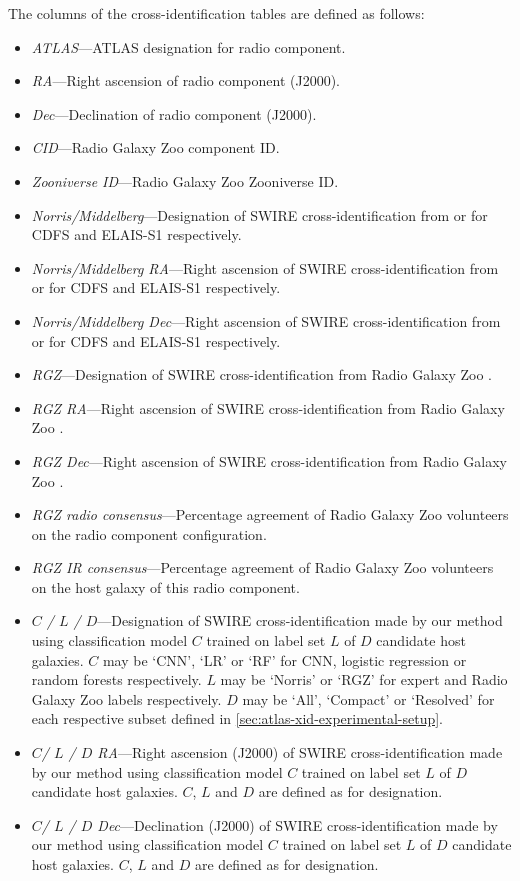   The columns of the cross-identification tables are defined as follows:
  \begin{itemize}
    \item \emph{ATLAS}---ATLAS designation for radio component.
    \item \emph{RA}---Right ascension of radio component (J2000).
    \item \emph{Dec}---Declination of radio component (J2000).
    \item \emph{CID}---Radio Galaxy Zoo component ID.
    \item \emph{Zooniverse ID}---Radio Galaxy Zoo Zooniverse ID.
    \item \emph{Norris/Middelberg}---Designation of SWIRE cross-identification from \citet{norris06} or \citet{middelberg08} for CDFS and ELAIS-S1 respectively.
    \item \emph{Norris/Middelberg RA}---Right ascension of SWIRE cross-identification from \citet{norris06} or \citet{middelberg08} for CDFS and ELAIS-S1 respectively.
    \item \emph{Norris/Middelberg Dec}---Right ascension of SWIRE cross-identification from \citet{norris06} or \citet{middelberg08} for CDFS and ELAIS-S1 respectively.
    \item \emph{RGZ}---Designation of SWIRE cross-identification from Radio Galaxy Zoo \citep{wong21rgz}.
    \item \emph{RGZ RA}---Right ascension of SWIRE cross-identification from Radio Galaxy Zoo \citep{wong21rgz}.
    \item \emph{RGZ Dec}---Right ascension of SWIRE cross-identification from Radio Galaxy Zoo \citep{wong21rgz}.
    \item \emph{RGZ radio consensus}---Percentage agreement of Radio Galaxy Zoo volunteers on the radio component configuration.
    \item \emph{RGZ IR consensus}---Percentage agreement of Radio Galaxy Zoo volunteers on the host galaxy of this radio component.
    \item \emph{$C$ / $L$ / $D$}---Designation of SWIRE cross-identification made by our method using classification model $C$ trained on label set $L$ of $D$ candidate host galaxies. $C$ may be `CNN', `LR' or `RF' for CNN, logistic regression or random forests respectively. $L$ may be `Norris' or `RGZ' for expert and Radio Galaxy Zoo labels respectively. $D$ may be `All', `Compact' or `Resolved' for each respective subset defined in \autoref{sec:atlas-xid-experimental-setup}.
    \item \emph{$C$/ $L$ / $D$ RA}---Right ascension (J2000) of SWIRE cross-identification made by our method using classification model $C$ trained on label set $L$ of $D$ candidate host galaxies. $C$, $L$ and $D$ are defined as for designation.
    \item \emph{$C$/ $L$ / $D$ Dec}---Declination (J2000) of SWIRE cross-identification made by our method using classification model $C$ trained on label set $L$ of $D$ candidate host galaxies. $C$, $L$ and $D$ are defined as for designation.
  \end{itemize}

